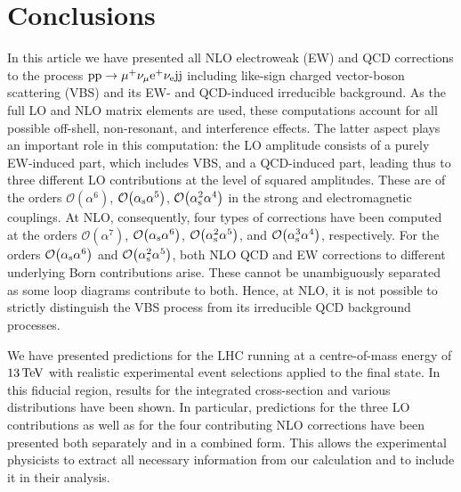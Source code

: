 \documentclass[a4article,11pt]{article}
\begin{document}
\section{Conclusions}
\label{sec:Conclusions}

In this article we have presented all NLO electroweak (EW) and QCD
corrections to the process $\text{p}\text{p}\to\mu^+\nu_\mu\text{e}^+\nu_{\text{e}}\text{j}\text{j}$
including like-sign charged vector-boson scattering (VBS) and its
EW- and QCD-induced irreducible background.  As the
full LO and NLO matrix elements are used, these computations account
for all possible off-shell, non-resonant, and interference effects.
The latter aspect plays an important role in this computation: the LO
amplitude consists of a purely 
EW-induced part, which includes
VBS, and a QCD-induced part, leading thus to three different LO
contributions at the level of squared amplitudes. These are of the
orders $\mathcal{O}{\left(\alpha^{6}\right)}$,
$\mathcal{O}{\left(\alpha_\text{s}\alpha^{5}\right)}$,
$\mathcal{O}{\left(\alpha_\text{s}^{2}\alpha^{4}\right)}$ in the strong
and electromagnetic couplings.  At NLO, consequently, four types of
corrections have been computed at the orders
$\mathcal{O}{\left(\alpha^{7}\right)}$,
$\mathcal{O}{\left(\alpha_\text{s}\alpha^{6}\right)}$,
$\mathcal{O}{\left(\alpha_\text{s}^{2}\alpha^{5}\right)}$, and
$\mathcal{O}{\left(\alpha_\text{s}^{3}\alpha^{4}\right)}$, respectively.
For the orders
$\mathcal{O}{\left(\alpha_\text{s}\alpha^{6}\right)}$ and
$\mathcal{O}{\left(\alpha_\text{s}^{2}\alpha^{5}\right)}$, both NLO QCD and EW
corrections to different underlying Born contributions arise.  These
cannot be unambiguously separated 
as some loop diagrams contribute to
both.
Hence, at NLO, it is not possible to strictly distinguish
the VBS process from its irreducible QCD background processes.

We have presented predictions for the LHC running at a
centre-of-mass energy of $13\,\text{TeV}$ with realistic experimental event
selections applied to the final state.  In this fiducial region,
results for the integrated cross-section and various distributions have been shown.  In particular, predictions for the
three LO contributions as well as for the four contributing NLO
corrections have been presented both separately and in a combined
form.  This allows the experimental physicists to extract all
necessary information from our calculation and to include it in their
analysis.
\end{document}
